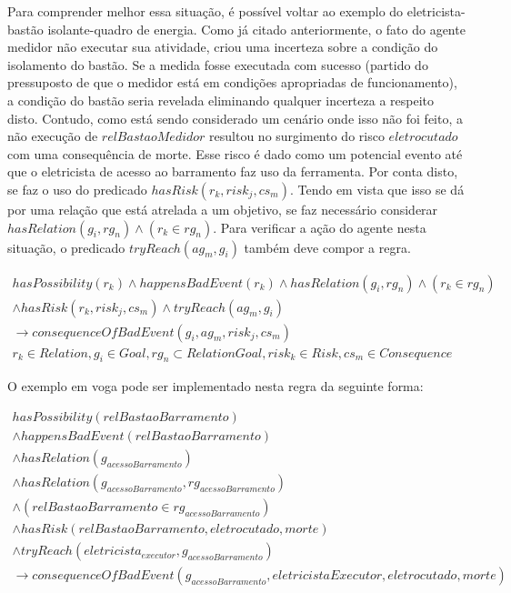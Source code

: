 Para comprender melhor essa situação, é possível voltar ao exemplo do eletricista-bastão isolante-quadro de energia. Como já citado anteriormente, o fato 
do agente medidor não executar sua atividade, criou uma incerteza sobre a condição do isolamento do bastão. Se a medida fosse executada com sucesso 
(partido do pressuposto de que o medidor está em condições apropriadas de funcionamento), a condição do bastão seria revelada eliminando qualquer incerteza 
a respeito disto. Contudo, como está sendo considerado um cenário onde isso não foi feito, a não execução de $relBastaoMedidor$ resultou no surgimento 
do risco $eletrocutado$ com uma consequência de morte. Esse risco é dado como um potencial evento até que o eletricista de acesso ao barramento faz uso da 
ferramenta. Por conta disto, se faz o uso do predicado $hasRisk(r_k,risk_j,cs_m)$. Tendo em vista que isso se dá por uma relação que está atrelada a um 
objetivo, se faz necessário considerar $hasRelation(g_i,rg_n) \wedge (r_k \in rg_n)$. Para verificar a ação do agente nesta situação, o predicado 
$tryReach(ag_m,g_i)$ também deve compor a regra.


\begin{eqnarray}\label{paybutiamnotguilty}
	hasPossibility(r_k) \wedge  happensBadEvent(r_k) \wedge hasRelation(g_i,rg_n) \wedge (r_k \in rg_n) \nonumber \\ 
	\wedge hasRisk(r_k,risk_j,cs_m) \wedge tryReach(ag_m,g_i) \nonumber \\ 
	\to consequenceOfBadEvent(g_i,ag_m,risk_j,cs_m) \nonumber \\ 
    r_k \in Relation, g_i \in Goal, rg_n \subset RelationGoal, risk_k \in Risk, cs_m \in Consequence
\end{eqnarray}

O exemplo em voga pode ser implementado nesta regra da seguinte forma: 


\begin{eqnarray}\nonumber
   hasPossibility(relBastaoBarramento) \nonumber \\
    \wedge happensBadEvent(relBastaoBarramento) \nonumber \\ 
    \wedge hasRelation(g_{acessoBarramento}) \nonumber \\  
    \wedge hasRelation(g_{acessoBarramento},rg_{acessoBarramento}) \nonumber \\  
    \wedge (relBastaoBarramento \in rg_{acessoBarramento}) \nonumber \\ 
    \wedge hasRisk(relBastaoBarramento,eletrocutado,morte) \nonumber \\  
    \wedge tryReach(eletricista_{executor},g_{acessoBarramento}) \nonumber \\ 
    \to consequenceOfBadEvent(g_{acessoBarramento},eletricistaExecutor,eletrocutado,morte) \\ \nonumber
\end{eqnarray}

